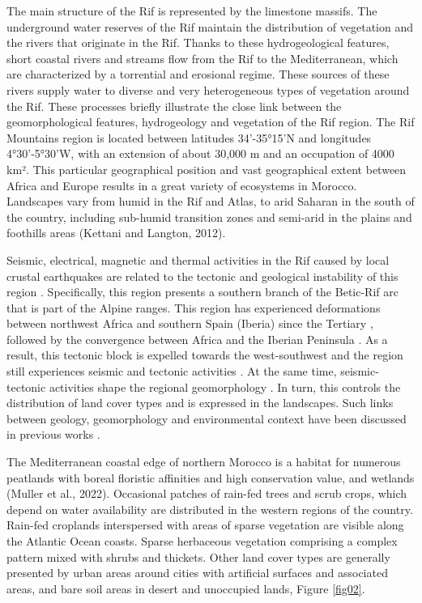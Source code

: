 \documentclass[geomatics,article,submit,pdftex,moreauthors]{Definitions/mdpi}
\begin{document}
The main structure of the Rif is represented by the limestone massifs. The underground water reserves of the Rif maintain the distribution of vegetation and the rivers that originate in the Rif. Thanks to these hydrogeological features, short coastal rivers and streams flow from the Rif to the Mediterranean, which are characterized by a torrential and erosional regime. These sources of these rivers supply water to diverse and very heterogeneous types of vegetation around the Rif. These processes briefly illustrate the close link between the geomorphological features, hydrogeology and vegetation of the Rif region. The Rif Mountains region is located between latitudes 34'-35°15'N and longitudes 4°30'-5°30'W, with an extension of about 30,000 m and an occupation of 4000 km². This particular geographical position and vast geographical extent between Africa and Europe results in a great variety of ecosystems in Morocco. Landscapes vary from humid in the Rif and Atlas, to arid Saharan in the south of the country, including sub-humid transition zones and semi-arid in the plains and foothills areas (Kettani and Langton, 2012).

Seismic, electrical, magnetic and thermal activities in the Rif caused by local crustal earthquakes are related to the tectonic and geological instability of this region \cite{DUARTE2024104330}. Specifically, this region presents a southern branch of the Betic-Rif arc that is part of the Alpine ranges. This region has experienced deformations between northwest Africa and southern Spain (Iberia) since the Tertiary \cite{CHABLI2014123}, followed by the convergence between Africa and the Iberian Peninsula \cite{LGHAMOUR2024108941,KAIROUANI2024106762}. As a result, this tectonic block is expelled towards the west-southwest and the region still experiences seismic and tectonic activities \cite{MALUSA2024230533}. At the same time, seismic-tectonic activities shape the regional geomorphology \cite{SADKAOUI2024105219}. In turn, this controls the distribution of land cover types and is expressed in the landscapes. Such links between geology, geomorphology and environmental context have been discussed in previous works \cite{COSTA2024109578,BOUTAHAR2023104828,KAIROUANI2024106762}.

The Mediterranean coastal edge of northern Morocco is a habitat for numerous peatlands with boreal floristic affinities and high conservation value, and wetlands (Muller et al., 2022). Occasional patches of rain-fed trees and scrub crops, which depend on water availability are distributed in the western regions of the country. Rain-fed croplands interspersed with areas of sparse vegetation are visible along the Atlantic Ocean coasts. Sparse herbaceous vegetation comprising a complex pattern mixed with shrubs and thickets. Other land cover types are generally presented by urban areas around cities with artificial surfaces and associated areas, and bare soil areas in desert and unoccupied lands, Figure \ref{fig02}.
\end{document}
